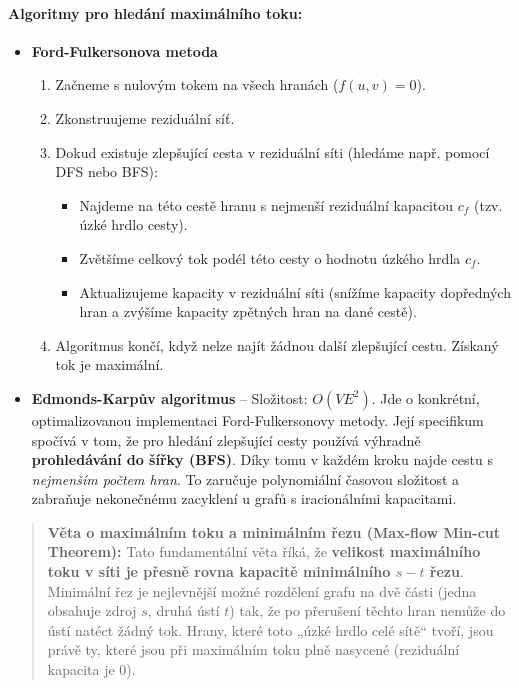\paragraph*{Algoritmy pro hledání maximálního toku:}
\begin{itemize}
\item \textbf{Ford-Fulkersonova metoda}
\begin{enumerate}
    \item Začneme s nulovým tokem na všech hranách ($f(u, v) = 0$).
    \item Zkonstruujeme reziduální síť.
    \item Dokud existuje zlepšující cesta v reziduální síti (hledáme např. pomocí DFS nebo BFS):
    \begin{itemize}
        \item Najdeme na této cestě hranu s nejmenší reziduální kapacitou $c_f$ (tzv. úzké hrdlo cesty).
        \item Zvětšíme celkový tok podél této cesty o hodnotu úzkého hrdla $c_f$.
        \item Aktualizujeme kapacity v reziduální síti (snížíme kapacity dopředných hran a zvýšíme kapacity zpětných hran na dané cestě).
    \end{itemize}
    \item Algoritmus končí, když nelze najít žádnou další zlepšující cestu. Získaný tok je maximální.
\end{enumerate}

\item \textbf{Edmonds-Karpův algoritmus} -- Složitost: $O(V E^2)$.
Jde o konkrétní, optimalizovanou implementaci Ford-Fulkersonovy metody. Její specifikum spočívá v tom, že pro hledání zlepšující cesty používá výhradně \textbf{prohledávání do šířky (BFS)}. Díky tomu v každém kroku najde cestu s \textit{nejmenším počtem hran}. To zaručuje polynomiální časovou složitost a zabraňuje nekonečnému zacyklení u grafů s iracionálními kapacitami.
\end{itemize}

\begin{quote}
\textbf{Věta o maximálním toku a minimálním řezu (Max-flow Min-cut Theorem):} 
Tato fundamentální věta říká, že \textbf{velikost maximálního toku v síti je přesně rovna kapacitě minimálního $s-t$ řezu}. Minimální řez je nejlevnější možné rozdělení grafu na dvě části (jedna obsahuje zdroj $s$, druhá ústí $t$) tak, že po přerušení těchto hran nemůže do ústí natéct žádný tok. Hrany, které toto „úzké hrdlo celé sítě“ tvoří, jsou právě ty, které jsou při maximálním toku plně nasycené (reziduální kapacita je $0$).
\end{quote}
\newpage

